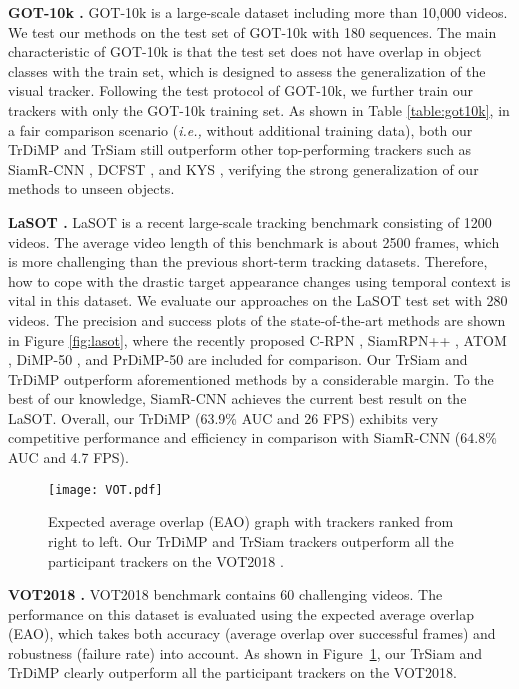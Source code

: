 \documentclass[10pt,twocolumn,letterpaper]{article}
\begin{document}
{\noindent \bf GOT-10k \cite{GOT10k}.} GOT-10k is a large-scale dataset including more than 10,000 videos. We test our methods on the test set of GOT-10k with 180 sequences. 
The main characteristic of GOT-10k is that the test set does not have overlap in object classes with the train set, which is designed to assess the generalization of the visual tracker.
Following the test protocol of GOT-10k, we further train our trackers with only the GOT-10k training set.
As shown in Table \ref{table:got10k}, in a fair comparison scenario (\emph{i.e.,} without additional training data), both our TrDiMP and TrSiam still outperform other top-performing trackers such as SiamR-CNN \cite{SiamRCNN}, DCFST \cite{DCFST}, and KYS \cite{KYS}, verifying the strong generalization of our methods to unseen objects.




{\noindent \bf LaSOT \cite{LaSOT}.} LaSOT is a recent large-scale tracking benchmark consisting of 1200 videos. The average video length of this benchmark is about 2500 frames, which is more challenging than the previous short-term tracking datasets. 
Therefore, how to cope with the drastic target appearance changes using temporal context is vital in this dataset. 
We evaluate our approaches on the LaSOT test set with 280 videos. 
The precision and success plots of the state-of-the-art methods are shown in Figure \ref{fig:lasot}, where the recently proposed C-RPN \cite{CRPN}, SiamRPN++ \cite{siamrpn++}, ATOM \cite{ATOM}, DiMP-50 \cite{DiMP}, and PrDiMP-50 \cite{PrDiMP} are included for comparison.
Our TrSiam and TrDiMP outperform aforementioned methods by a considerable margin.
To the best of our knowledge, SiamR-CNN \cite{SiamRCNN} achieves the current best result on the LaSOT.
Overall, our TrDiMP (63.9\% AUC and 26 FPS) exhibits very competitive performance
and efficiency in comparison with SiamR-CNN (64.8\% AUC and 4.7 FPS).




\begin{figure}[t]
	\centering
	\texttt{[image: VOT.pdf]}
	\caption{Expected average overlap (EAO) graph with trackers ranked from right to left. Our TrDiMP and TrSiam trackers outperform all the participant trackers on the VOT2018 \cite{VOT2018}.}\label{fig:vot} 
	\vspace{-0.1in}
\end{figure}




{\noindent \bf VOT2018 \cite{VOT2018}.} VOT2018 benchmark contains 60 challenging videos. 
The performance on this dataset is evaluated using the expected
average overlap (EAO), which takes both accuracy (average overlap over successful frames) and robustness (failure rate) into account. 
As shown in Figure~\ref{fig:vot}, our TrSiam and TrDiMP clearly outperform all the participant trackers on the VOT2018.
\end{document}
